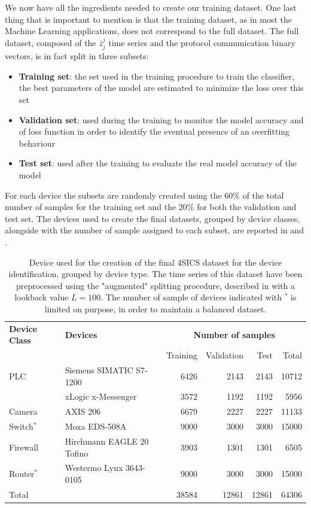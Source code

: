 We now have all the ingredients needed to create our training dataset. One last thing that is important to mention is that the training dataset, as in most the Machine Learning applications,
does not correspond to the full dataset. The full dataset, composed of the $\bar{z}_j^j$ time series and the protocol communication binary vectors, is in fact split in three subsets:
\begin{itemize}[noitemsep, nolistsep]
    \item \textbf{Training set}: the set used in the training procedure to train the classifier, the best parameters of the model are estimated to minimize the loss over this set
    \item \textbf{Validation set}: used during the training to monitor the model accuracy and of  loss function in order to identify the eventual presence of an overfitting behaviour 
    \item \textbf{Test set}: used after the training to evaluate the real model accuracy of the model
\end{itemize}
For each device the subsets are randomly created using the 60\% of the total number of samples for the training set and the 20\% for both the validation and test set.
The devices used to create the final datasets, grouped by device classes, alongside with the number of sample assigned to each subset, are reported in  and .




\begin{table}[h]
\centering
\begin{tabular}{llrrrr}
\toprule
\textbf{Device Class} & \textbf{Devices} & \multicolumn{4}{c}{\textbf{Number of samples}} \\
& & Training & Validation & Test & Total \\
\midrule
\multirow{1}{*}{PLC} & Siemens SIMATIC S7-1200 & 6426 & 2143 & 2143 & 10712  \\
                     & xLogic x-Messenger & 3572 & 1192 & 1192 & 5956  \\
\midrule
\multirow{1}{*}{Camera}  & AXIS 206 & 6679 & 2227 & 2227 & 11133 \\
\midrule
\multirow{1}{*}{Switch$^*$} & Moxa EDS-508A  & 9000 & 3000 & 3000 & 15000 \\
\midrule
\multirow{1}{*}{Firewall}& Hirchmann EAGLE 20 Tofino & 3903 & 1301 & 1301 & 6505 \\
\midrule
\multirow{1}{*}{Router$^*$} & Westermo Lynx 3643-0105  & 9000 & 3000 & 3000 & 15000  \\ 
\midrule
\midrule
Total & & 38584 & 12861 & 12861 & 64306 \\
\bottomrule
\end{tabular}
\caption{Device used for the creation of the final 4SICS dataset for the device identification, grouped by device type. The time series of this dataset have been preprocessed using the "augmented" splitting procedure, described in  with a lookback value $L=100$. The number of sample of devices indicated with $^*$ is limited on purpose, in order to maintain a balanced dataset.}
\label{tab:4sicsdev}
\end{table}



